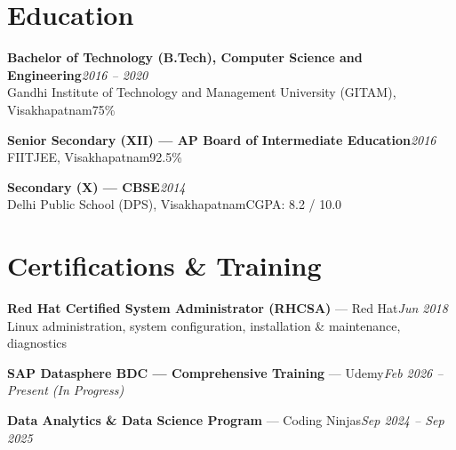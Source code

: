 \documentclass[10pt, letterpaper]{article}
\begin{document}
\section{Education}

{\bfseries Bachelor of Technology (B.Tech), Computer Science and Engineering}\hfill{\small\color{muted}\textit{2016 -- 2020}}\\
{\small\color{muted}Gandhi Institute of Technology and Management University (GITAM), Visakhapatnam\hfill 75\%}

\vspace{2pt}
{\bfseries Senior Secondary (XII) --- AP Board of Intermediate Education}\hfill{\small\color{muted}\textit{2016}}\\
{\small\color{muted}FIITJEE, Visakhapatnam\hfill 92.5\%}

\vspace{2pt}
{\bfseries Secondary (X) --- CBSE}\hfill{\small\color{muted}\textit{2014}}\\
{\small\color{muted}Delhi Public School (DPS), Visakhapatnam\hfill CGPA: 8.2 / 10.0}

\section{Certifications \& Training}

{\bfseries Red Hat Certified System Administrator (RHCSA)} --- Red Hat\hfill{\small\color{muted}\textit{Jun 2018}}\\
{\small\color{muted}Linux administration, system configuration, installation \& maintenance, diagnostics}

\vspace{1pt}
{\bfseries SAP Datasphere BDC --- Comprehensive Training} --- Udemy\hfill{\small\color{muted}\textit{Feb 2026 -- Present \emph{(In Progress)}}}

\vspace{1pt}
{\bfseries Data Analytics \& Data Science Program} --- Coding Ninjas\hfill{\small\color{muted}\textit{Sep 2024 -- Sep 2025}}

\end{document}
